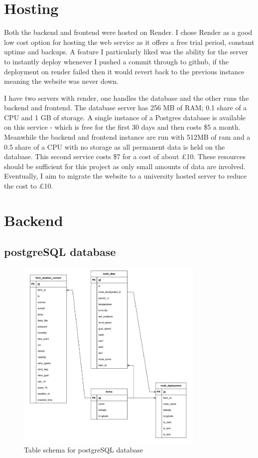 \section{Hosting}

Both the backend and frontend were hosted on Render. I chose Render as a good
low cost option for hosting the web service as it offers a free trial period,
constant uptime and backups. A feature I particularly liked was the ability for
the server to instantly deploy whenever I pushed a commit through to github, if
the deployment on render failed then it would revert back to the previous
instance meaning the website was never down. 

I have two servers with render, one handles the database and the other runs the
backend and frontend. The database server has 256 MB of RAM; 0.1 share of a CPU
and 1 GB of storage. A single instance of a Postgres database is available on
this service - which is free for the first 30 days and then costs \$5 a month.
Meanwhile the backend and frontend instance are run with 512MB of ram and a 0.5
share of a CPU with no storage as all permanent data is held on the database.
This second service costs \$7 for a cost of about £10. These resources should be
sufficient for this project as only small amounts of data are involved.
Eventually, I aim to migrate the website to a university hosted server to reduce
the cost to \pounds10.

\section{Backend}

\subsection{postgreSQL database}

\begin{figure}[H]
    \centering
    \includegraphics[width=0.8\textwidth]{contents/part-3/fig3/postgres_diagram.png}
    \caption{Table schema for postgreSQL database}
    \label{fig:db_schema}
\end{figure}

